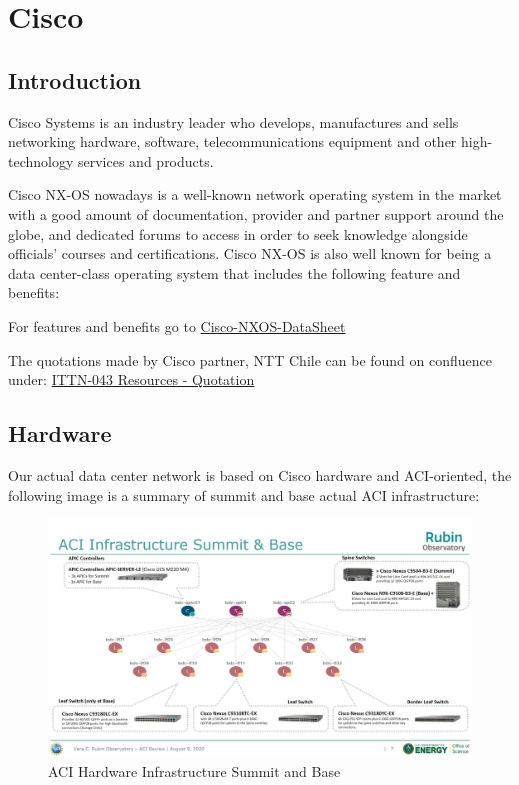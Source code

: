 \section{Cisco}

\subsection{Introduction}

Cisco Systems is an industry leader who develops, manufactures and sells networking hardware, software, telecommunications equipment and other high-technology services and products. 

Cisco NX-OS nowadays is a  well-known network operating system in the market with a good amount of documentation, provider and partner support around the globe, and dedicated forums to access in order to seek knowledge alongside officials’ courses and certifications. Cisco NX-OS is also well known for being a data center-class operating system that includes the following feature and benefits:

For features and benefits go to \href{https://www.cisco.com/c/en/us/products/collateral/ios-nx-os-software/nx-os-software/data_sheet_c78-652063.pdf}{Cisco-NXOS-DataSheet}

The quotations made by Cisco partner, NTT Chile can be found on confluence under: \href{https://confluence.lsstcorp.org/display/IT/ITTN-043+-+Rubin+Network+Re-Engineering}{ITTN-043 Resources - Quotation}

\subsection{Hardware}

Our actual data center network is based on Cisco hardware and ACI-oriented, the following image is a summary of summit and base actual ACI infrastructure:


\begin{figure}
    \centering
	\includegraphics[scale=1.2]{images/aci-infrastructure-summit-and-base.jpg}
    \caption{ACI Hardware Infrastructure Summit and Base}
\end{figure}



